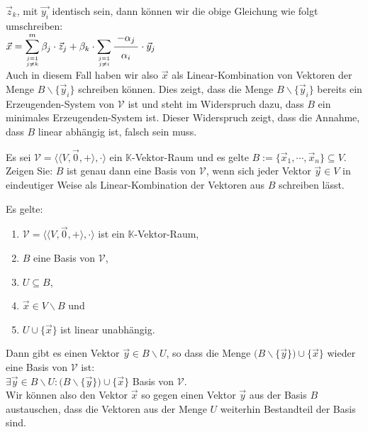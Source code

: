 $\vec{z}_k$, mit $\vec{y_i}$ identisch sein, dann k\"{o}nnen wir die obige Gleichung wie folgt
umschreiben:
\\[0.2cm]
\hspace*{1.3cm}
$\ds\vec{x} = \sum\limits_{j=1 \atop j \not=k}^m \beta_j \cdot \vec{z}_j + 
              \beta_k \cdot \sum\limits_{j=1 \atop j \not= i} \bruch{-\alpha_j}{\alpha_i} \cdot \vec{y}_j
$
\\[0.2cm]
Auch in diesem Fall haben wir also $\vec{x}$ als Linear-Kombination von Vektoren der Menge 
$B \backslash \{ \vec{y}_i \}$ schreiben k\"{o}nnen.  Dies zeigt, dass die Menge
$B \backslash \{ \vec{y}_i \}$ bereits ein Erzeugenden-System von $\mathcal{V}$ ist und steht im
Widerspruch dazu, dass $B$ ein minimales Erzeugenden-System ist.  Dieser Widerspruch zeigt, dass die
Annahme, dass $B$ linear abh\"{a}ngig ist, falsch sein muss. \qeds

\exercise
Es sei $\mathcal{V} = \bigl\langle \langle V, \vec{0}, + \rangle, \cdot \bigr\rangle$ ein $\mathbb{K}$-Vektor-Raum und es gelte $B := \{ \vec{x}_1, \cdots, \vec{x}_n \} \subseteq V$.
Zeigen Sie:  $B$ ist genau dann eine Basis von $\mathcal{V}$, wenn sich jeder Vektor $\vec{y} \in V$ in
eindeutiger Weise als Linear-Kombination der Vektoren aus $B$ schreiben l\"{a}sst.
\eoxs

\begin{LemmaStar}
  Es gelte:
  \begin{enumerate}
  \item $\mathcal{V} = \bigl\langle \langle V, \vec{0}, + \rangle, \cdot \bigr\rangle$ ist ein $\mathbb{K}$-Vektor-Raum, 
  \item $B$ eine Basis von $\mathcal{V}$,
  \item $U \subseteq B$,
  \item $\vec{x} \in V\backslash B$ und 
  \item $U \cup \{ \vec{x} \}$ ist linear unabh\"{a}ngig.
  \end{enumerate}
  Dann gibt es einen Vektor $\vec{y} \in B \backslash U$, so dass die Menge
  $\bigl(B \backslash \{ \vec{y} \}\bigr) \cup \{ \vec{x} \}$ wieder eine Basis von $\mathcal{V}$ ist:
  \\[0.2cm]
  \hspace*{1.3cm}
  $\exists \vec{y} \in B \backslash U: \bigl(B \backslash \{ \vec{y} \}\bigr) \cup \{ \vec{x} \}$ Basis von $\mathcal{V}$.
  \\[0.2cm]
  Wir k\"{o}nnen also den Vektor $\vec{x}$ so gegen einen Vektor $\vec{y}$ aus der Basis $B$
  austauschen, dass die Vektoren aus der Menge $U$ weiterhin Bestandteil der Basis sind.
\end{LemmaStar}

